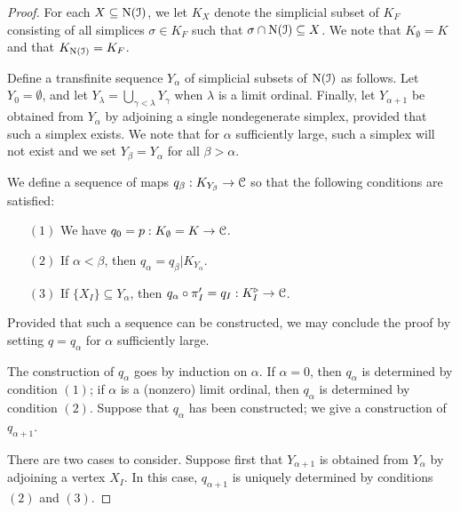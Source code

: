 \begin{proof}
For each $X \subseteq \operatorname{N}(\operatorname{\mathcal{I}})$, we let $K_{X}$ denote the
simplicial subset of $K_F$ consisting of all simplices $\sigma \in
K_{F}$ such that $\sigma \cap \operatorname{N}(\operatorname{\mathcal{I}}) \subseteq X$. We note that
$K_{\emptyset} = K$ and that $K_{ \operatorname{N}(\operatorname{\mathcal{I}}) } = K_{F}$.

Define a transfinite sequence $Y_{\alpha}$ of simplicial subsets
of $\operatorname{N}(\operatorname{\mathcal{I}})$ as follows. Let $Y_{0} = \emptyset$, and let
$Y_{\lambda} = \bigcup_{ \gamma < \lambda } Y_{\gamma}$ when
$\lambda$ is a limit ordinal. Finally, let $Y_{\alpha+1}$ be
obtained from $Y_{\alpha}$ by adjoining a single nondegenerate
simplex, provided that such a simplex exists. We note that for
$\alpha$ sufficiently large, such a simplex will not exist and we
set $Y_{\beta} = Y_{\alpha}$ for all $\beta > \alpha$.

We define a sequence of maps $q_{\beta}: K_{Y_{\beta}} \rightarrow
\operatorname{\mathcal{C}}$ so that the following conditions are satisfied:

\begin{itemize}
\item[$(1)$] We have $q_{0} = p: K_{\emptyset} = K \rightarrow \operatorname{\mathcal{C}}$.

\item[$(2)$] If $\alpha < \beta$, then $q_{\alpha} = q_{\beta} |
K_{Y_{\alpha}}$.

\item[$(3)$] If $\{X_I\} \subseteq Y_{\alpha}$, then $q_{\alpha} \circ \pi'_I = q_I: K_I^{\triangleright} \rightarrow \operatorname{\mathcal{C}}$.

\end{itemize}
Provided that such a sequence can be constructed, we may conclude
the proof by setting $q = q_{\alpha}$ for $\alpha$ sufficiently
large.

The construction of $q_{\alpha}$ goes by induction on $\alpha$. If
$\alpha = 0$, then $q_{\alpha}$ is determined by condition $(1)$;
if $\alpha$ is a (nonzero) limit ordinal, then $q_{\alpha}$ is
determined by condition $(2)$. Suppose that $q_{\alpha}$ has been
constructed; we give a construction of $q_{\alpha+1}$.

There are two cases to consider. Suppose first that $Y_{\alpha+1}$
is obtained from $Y_{\alpha}$ by adjoining a vertex $X_I$. In this
case, $q_{\alpha+1}$ is uniquely determined by conditions $(2)$
and $(3)$.


\end{proof}
